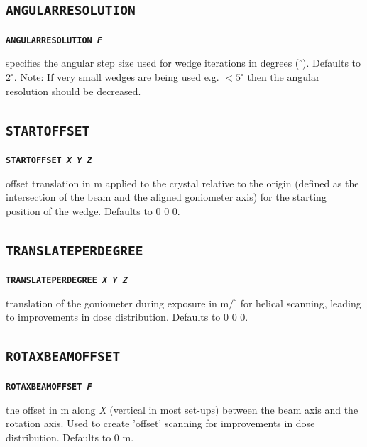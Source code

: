 \documentclass[a4paper]{article}
\newcommand{\Keyword}[1]{\texttt{\textbf{#1}}\xspace}
\begin{document}
\subsection{\Keyword{ANGULARRESOLUTION}}

\noindent \Keyword{ANGULARRESOLUTION \textit{F}}

specifies the angular step size used for wedge iterations in degrees ($^\circ$). Defaults to $2^\circ$.
\newline
Note: If very small wedges are being used e.g. $<5^{\circ}$ then the angular resolution should be decreased.



\subsection{\Keyword{STARTOFFSET}}

\noindent \Keyword{STARTOFFSET \textit{X Y Z}}

offset translation in \hbox{\textmu}m applied to the crystal relative to the origin (defined as the intersection of the beam and the aligned goniometer axis) for the starting position of the wedge. Defaults to 0 0 0.



\subsection{\Keyword{TRANSLATEPERDEGREE}}

\noindent \Keyword{TRANSLATEPERDEGREE \textit{X Y Z}}

translation of the goniometer during exposure in \hbox{\textmu}m$/^{\circ}$ for helical scanning, leading to improvements in dose distribution. Defaults to 0 0 0.



\subsection{\Keyword{ROTAXBEAMOFFSET}}

\noindent \Keyword{ROTAXBEAMOFFSET \textit{F}}

the offset in \hbox{\textmu}m along \textit{X} (vertical in most set-ups) between the beam axis and the rotation axis. Used to create 'offset' scanning for improvements in dose distribution. Defaults to 0 \hbox{\textmu}m.
\end{document}
